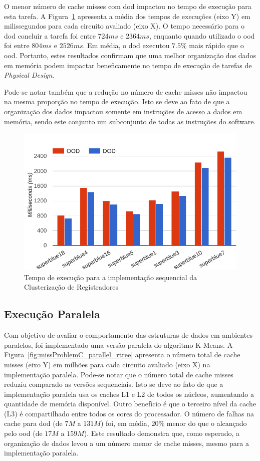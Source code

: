 O menor número de cache misses com \ac{dod} impactou no tempo de execução para esta tarefa.
A Figura~\ref{fig:runtimeProblemC_sequential_rtree} apresenta a média dos tempos de execuções (eixo Y) em milissegundos para cada circuito avaliado (eixo X).
O tempo necessário para o \ac{dod} concluir a tarefa foi entre $724ms$ e $2364ms$, enquanto quando utilizado o \ac{ood} foi entre $804ms$ e $2526ms$.
Em média, o \ac{dod} executou $7.5\%$ mais rápido que o \ac{ood}.
Portanto, estes resultados confirmam que uma melhor organização dos dados em memória podem impactar beneficamente no tempo de execução de tarefas de \textit{Physical Design}.

Pode-se notar também que a redução no número de cache misses não impactou na mesma proporção no tempo de execução. Isto se deve ao fato de que a organização dos dados impactou somente em instruções de acesso a dados em memória, sendo este conjunto um subconjunto de todas as instruções do software.

\begin{figure}[ht]
    \centering
    \includegraphics[width=0.7\linewidth]{img/results/runtimeProblemC_sequential_rtree}
    \caption[Tempo de execução Problema~C versão sequencial]{Tempo de execução para a implementação sequencial da Clusterização de Registradores}
    \label{fig:runtimeProblemC_sequential_rtree}
\end{figure}

\subsection{Execução Paralela}
\label{subsec:execucaoParalelaProblemaC}

Com objetivo de avaliar o comportamento das estruturas de dados em ambientes paralelos, foi implementado uma versão paralela do algoritmo K-Means.
A Figura~\ref{fig:missProblemC_parallel_rtree} apresenta o número total de cache misses (eixo Y) em milhões para cada circuito avaliado (eixo X) na implementação paralela.  
Pode-se notar que o número total de cache misses reduziu comparado as versões sequenciais. Isto se deve ao fato de que a implementação paralela usa os caches L1 e L2 de todos os núcleos, aumentando a quantidade de memória disponível. Outro benefício é que o terceiro nível da cache (L3) é compartilhado entre todos os cores do processador.
O número de falhas na cache para \ac{dod} (de $7M$ a $131M$) foi, em média, $20\%$ menor do que o alcançado pelo \ac{ood} (de $17M$ a $159M$). Este resultado demonstra que, como esperado, a organização de dados levou a um número menor de cache misses, mesmo para a implementação paralela.

